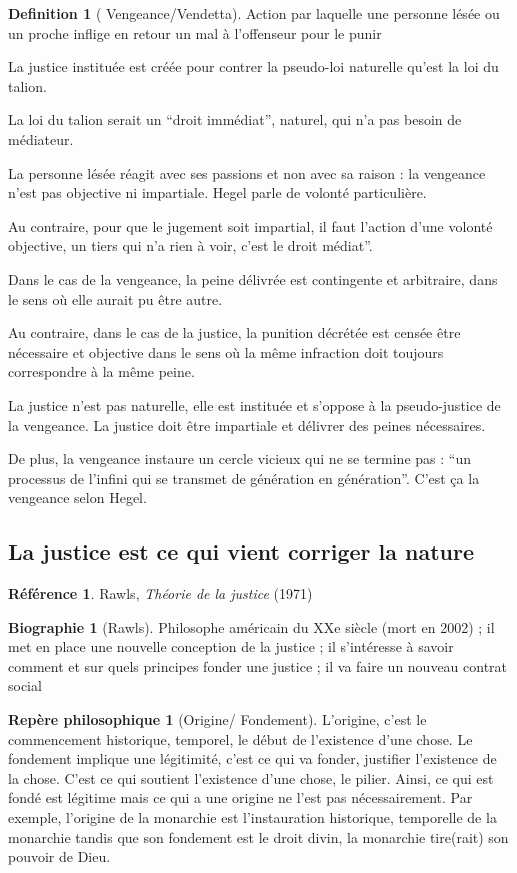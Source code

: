 \documentclass[french]{book}
\theoremstyle{definition}
\newtheorem*{dfn}{Definition}
\newtheorem*{refe}{Référence}
\newtheorem*{rep}{Repère philosophique}
\newtheorem*{bio}{Biographie}
\begin{document}
\begin{dfn}[ Vengeance/Vendetta]
Action par laquelle une personne lésée ou un proche inflige en retour un mal à l’offenseur pour le punir
\end{dfn}

La justice instituée est créée pour contrer la pseudo-loi naturelle qu’est la loi du talion.

La loi du talion serait un “droit immédiat”, naturel, qui n’a pas besoin de médiateur.

La personne lésée réagit avec ses passions et non avec sa raison : la vengeance n’est pas objective ni impartiale. Hegel parle de volonté particulière.

Au contraire, pour que le jugement soit impartial, il faut l’action d’une volonté objective, un tiers qui n’a rien à voir, c’est le droit médiat”.

Dans le cas de la vengeance, la peine délivrée est contingente et arbitraire, dans le sens où elle aurait pu être autre. 

Au contraire, dans le cas de la justice, la punition décrétée est censée être nécessaire et objective dans le sens où la même infraction doit toujours correspondre à la même peine.

La justice n’est pas naturelle, elle est instituée et s’oppose à la pseudo-justice de la vengeance. La justice doit être impartiale et délivrer des peines nécessaires.

De plus, la vengeance instaure un cercle vicieux qui ne se termine pas : “un processus de l’infini qui se transmet de génération en génération”. C’est ça la vengeance selon Hegel.

\subsection{La justice est ce qui vient corriger la nature}

\begin{refe}
	Rawls, \textit{Théorie de la justice} (1971)
\end{refe}

\begin{bio}[Rawls]
	Philosophe américain du XXe siècle (mort en 2002) ; il met en place une nouvelle conception de la justice ; il s’intéresse à savoir comment et sur quels principes fonder une justice ; il va faire un nouveau contrat social
\end{bio}

\begin{rep}[Origine/ Fondement]
L’origine, c’est le commencement historique, temporel, le début de l’existence d’une chose.
Le fondement implique une légitimité, c’est ce qui va fonder, justifier l’existence de la chose. C’est ce qui soutient l’existence d’une chose, le pilier.
Ainsi, ce qui est fondé est légitime mais ce qui a une origine ne l’est pas nécessairement.
Par exemple, l’origine de la monarchie est l’instauration historique, temporelle de la monarchie tandis que son fondement est le droit divin, la monarchie tire(rait) son pouvoir de Dieu.
\end{rep}
\end{document}
